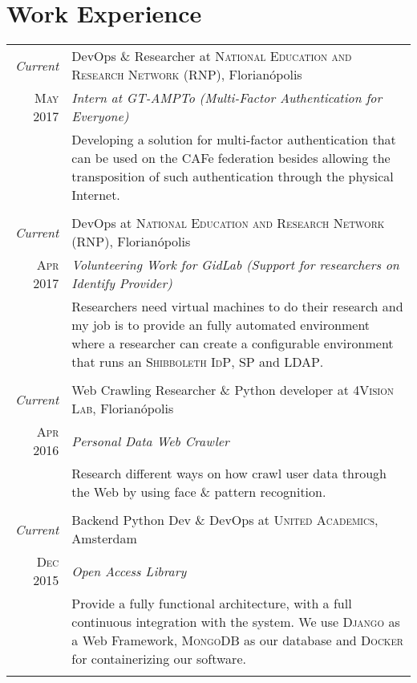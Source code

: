 \documentclass[a4paper,10pt]{article}
\begin{document}
\section{Work Experience}
\begin{longtable}{r|p{11cm}}

\emph{Current} & DevOps \& Researcher at \textsc{National Education and Research Network (RNP)}, Florianópolis \\\textsc{May 2017} & \emph{Intern at GT-AMPTo (Multi-Factor Authentication for Everyone)}\\&\footnotesize{Developing a solution for multi-factor authentication that can be used on the CAFe federation besides allowing the transposition of such authentication through the physical Internet.}\\\multicolumn{2}{c}{} \\

\emph{Current} & DevOps at \textsc{National Education and Research Network (RNP)}, Florianópolis \\\textsc{Apr 2017} & \emph{Volunteering Work for GidLab (Support for researchers on Identify Provider)}\\&\footnotesize{Researchers need virtual machines to do their research and my job is to provide an fully automated environment where a researcher can create a configurable environment that runs an \textsc{Shibboleth} \textsc{IdP}, \textsc{SP} and \textsc{LDAP}.}\\\multicolumn{2}{c}{} \\

\emph{Current} & Web Crawling Researcher \& Python developer at \textsc{4Vision Lab}, Florianópolis \\\textsc{Apr 2016} & \emph{Personal Data Web Crawler}\\&\footnotesize{Research different ways on how crawl user data through the Web by using face \& pattern recognition.}\\\multicolumn{2}{c}{} \\

\emph{Current} & Backend Python Dev \& DevOps at \textsc{United Academics}, Amsterdam \\\textsc{Dec 2015} & \emph{Open Access Library}\\&\footnotesize{Provide a fully functional architecture, with a full continuous integration with the system. We use \textsc{Django} as a Web Framework, \textsc{MongoDB} as our database and \textsc{Docker} for containerizing our software.}\\\multicolumn{2}{c}{} \\


\end{longtable}
\end{document}
